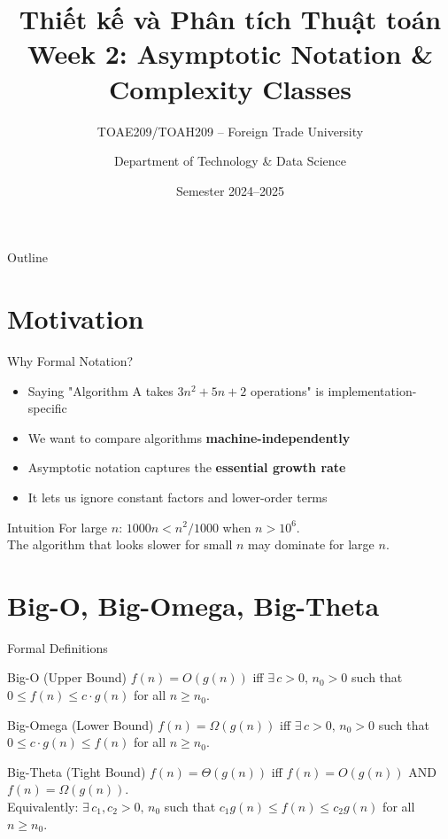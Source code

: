 \documentclass[aspectratio=169,xcolor=dvipsnames]{beamer}
\title[Algorithms -- Week 2]{\textbf{Thiết kế và Phân tích Thuật toán}\\
  \large Week 2: Asymptotic Notation \& Complexity Classes}
\subtitle{TOAE209/TOAH209 -- Foreign Trade University}
\author{Department of Technology \& Data Science}
\date{Semester 2024--2025}
\begin{document}
\begin{frame}\titlepage\end{frame}
\begin{frame}{Outline}\tableofcontents\end{frame}

\section{Motivation}
\begin{frame}{Why Formal Notation?}
  \begin{itemize}
    \item Saying "Algorithm A takes $3n^2 + 5n + 2$ operations" is implementation-specific
    \item We want to compare algorithms \textbf{machine-independently}
    \item Asymptotic notation captures the \textbf{essential growth rate}
    \item It lets us ignore constant factors and lower-order terms
  \end{itemize}
  \begin{exampleblock}{Intuition}
    For large $n$: $1000n < n^2/1000$ when $n > 10^6$.\\
    The algorithm that looks slower for small $n$ may dominate for large $n$.
  \end{exampleblock}
\end{frame}

\section{Big-O, Big-Omega, Big-Theta}
\begin{frame}{Formal Definitions}
  \begin{block}{Big-O (Upper Bound)}
    $f(n) = O(g(n))$ iff $\exists\, c > 0,\, n_0 > 0$ such that
    $0 \le f(n) \le c \cdot g(n)$ for all $n \ge n_0$.
  \end{block}
  \begin{block}{Big-Omega (Lower Bound)}
    $f(n) = \Omega(g(n))$ iff $\exists\, c > 0,\, n_0 > 0$ such that
    $0 \le c \cdot g(n) \le f(n)$ for all $n \ge n_0$.
  \end{block}
  \begin{exampleblock}{Big-Theta (Tight Bound)}
    $f(n) = \Theta(g(n))$ iff $f(n) = O(g(n))$ AND $f(n) = \Omega(g(n))$.\\
    Equivalently: $\exists\, c_1, c_2 > 0,\, n_0$ such that
    $c_1 g(n) \le f(n) \le c_2 g(n)$ for all $n \ge n_0$.
  \end{exampleblock}
\end{frame}
\end{document}
